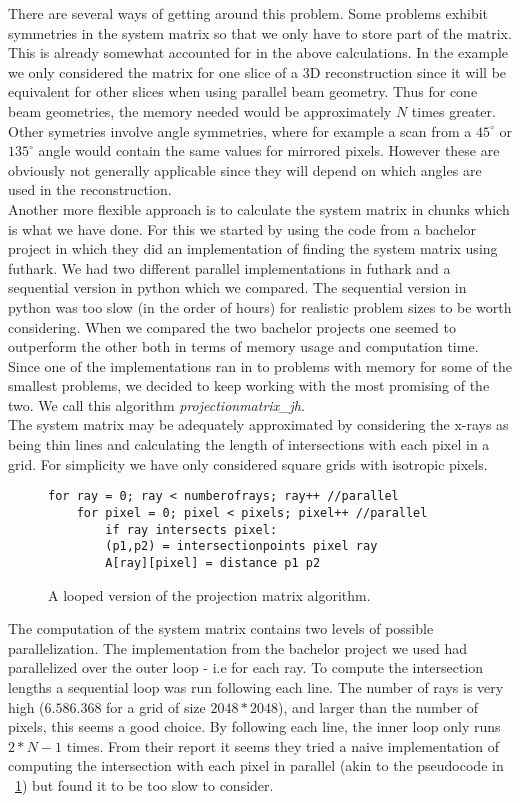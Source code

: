 There are several ways of getting around this problem. Some problems exhibit symmetries in the system matrix so that we only have to store part of the matrix. This is already somewhat accounted for in the above calculations. In the example we only considered the matrix for one slice of a 3D reconstruction since it will be equivalent for other slices when using parallel beam geometry. Thus for cone beam geometries, the memory needed would be approximately $N$ times greater. Other symetries involve angle symmetries, where for example a scan from a $45^{\circ}$ or $135^{\circ}$ angle would contain the same values for mirrored pixels. However these are obviously not generally applicable since they will depend on which angles are used in the reconstruction.\\
Another more flexible approach is to calculate the system matrix in chunks which is what we have done. For this we started by using the code from a bachelor project in which they did an implementation of finding the system matrix using futhark. We had two different parallel implementations in futhark and a sequential version in python which we compared. The sequential version in python was too slow (in the order of hours) for realistic problem sizes to be worth considering. When we compared the two bachelor projects one seemed to outperform the other both in terms of memory usage and computation time. Since one of the implementations ran in to problems with memory for some of the smallest problems, we decided to keep working with the most promising of the two. We call this algorithm \emph{projectionmatrix\_jh}.\\
The system matrix may be adequately approximated by considering the x-rays as being thin lines and calculating the length of intersections with each pixel in a grid. For simplicity we have only considered square grids with isotropic pixels.\\ \begin{figure}[h]
\begin{lstlisting}[frame=single]
for ray = 0; ray < numberofrays; ray++ //parallel
	for pixel = 0; pixel < pixels; pixel++ //parallel
		if ray intersects pixel:
        (p1,p2) = intersectionpoints pixel ray
        A[ray][pixel] = distance p1 p2
\end{lstlisting}
\label{sysmat}
  \caption{A looped version of the projection matrix algorithm.}
\end{figure}
The computation of the system matrix contains two levels of possible parallelization. The implementation from the bachelor project we used had parallelized over the outer loop - i.e for each ray. To compute the intersection lengths a sequential loop was run following each line. The number of rays is very high ($6.586.368$ for a grid of size $2048*2048$), and larger than the number of pixels, this seems a good choice. By following each line, the inner loop only runs $2*N-1$ times. From their report it seems they tried a naive implementation of computing the intersection with each pixel in parallel (akin to the pseudocode in ~\ref{sysmat}) but found it to be too slow to consider.\\

